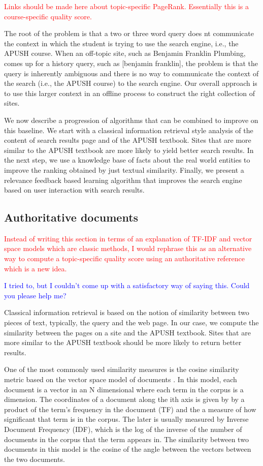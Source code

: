 \documentclass[pdfpagelabels=false,plainpages=true]{acm_proc_article-sp}
\begin{document}
\textcolor{red}{Links should be made here about topic-specific
  PageRank. Essentially this is a course-specific quality score.}

The root of the problem is that a two or three word query does nt communicate
the context in which the student is trying to use the search engine, i.e., the
APUSH course.  When an off-topic site, such as Benjamin Franklin Plumbing, comes
up for a history query, such as [benjamin franklin], the problem is that the
query is inherently ambiguous and there is no way to communicate the context of
the search (i.e., the APUSH course) to the search engine.  Our overall approach
is to use this larger context in an offline process to construct the right
collection of sites. 

We now describe a progression of algorithms that can be combined to improve on
this baseline. We start with a classical information retrieval style analysis of
the content of search results page and of the APUSH textbook. Sites that are
more similar to the APUSH textbook are more likely to yield better search
results. In the next step, we use a knowledge base of facts about the real world
entities to improve the ranking obtained by just textual similarity. Finally, we
present a relevance feedback based learning algorithm that improves the search
engine based on user interaction with search results. 

\subsection{Authoritative documents}

\textcolor{red}{Instead of writing this section in terms of an explanation of
  TF-IDF and vector space models which are classic methods, I would rephrase this
  as an alternative way to compute a topic-specific quality score using an
  authoritative reference which is a new idea.}

\textcolor{blue}{I tried to, but I couldn't come up with a satisfactory way of
  saying this. Could you please help me?} 

Classical information retrieval is based on the notion of similarity between two
pieces of text, typically, the query and the web page.  In our case, we compute
the similarity between the pages on a site and the APUSH textbook. Sites that
are more similar to the APUSH textbook should  be more likely to return better
results. 

One of the most commonly used similarity measures is the cosine similarity
metric based on the vector space model of documents \cite{salton1975vector}. In
this model, each document is a vector in an N dimensional where each term in the
corpus is a dimension. The coordinates of a document along the ith axis is given by by a
product of the term's frequency in the document (TF) and the a measure of how
significant that term is in the corpus. The later is usually measured by Inverse
Document Frequency (IDF), which is the log of the inverse of the number of
documents in the corpus that the term appears in. The similarity between two
documents in this model is the cosine of the angle between the vectors between
the two documents. 
\end{document}
